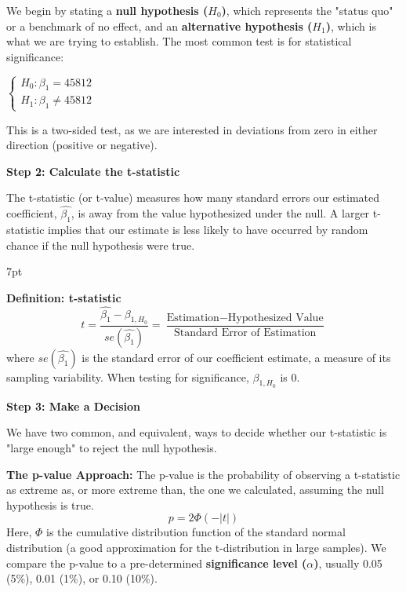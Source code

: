 \documentclass{article}
\newenvironment{greenblock}{%
\def\FrameCommand{%
  \hspace{1pt}%
    {\color{Green}%
    \vrule width 2pt}%
    {\color{greenshade}%
    \vrule width 4pt}%
  \colorbox{greenshade}%
}%
\MakeFramed{%
  \advance%
  \hsize-%
  \width%
  \FrameRestore}%
\noindent\hspace{-4.55pt}%
\begin{adjustwidth}{}{7pt}%
\vspace{2pt}\vspace{2pt}%
}
{%
\vspace{2pt}\end{adjustwidth}\endMakeFramed%
}
\begin{document}
We begin by stating a \textbf{null hypothesis ($H_0$)}, which represents the "status quo" or a benchmark of no effect, and an \textbf{alternative hypothesis ($H_1$)}, which is what we are trying to establish. The most common test is for statistical significance:

$\begin{cases}
  H_0: \beta_1  = 45812
  \\
  H_1: \beta_1 \neq 45812
\end{cases}$

This is a two-sided test, as we are interested in deviations from zero in either direction (positive or negative).

\textbf{Step 2: Calculate the t-statistic}

The t-statistic (or t-value) measures how many standard errors our estimated coefficient, $\hat{\beta_1}$, is away from the value hypothesized under the null. A larger t-statistic implies that our estimate is less likely to have occurred by random chance if the null hypothesis were true.

\begin{greenblock}
\textbf{Definition: t-statistic}
\begin{equation}
  t=\frac{\hat{\beta_{1}}-\beta_{1, H_0}}{se(\hat{\beta_{1}})}=\frac{\text{Estimation}-\text{Hypothesized Value}}{\text{Standard Error of Estimation}}
\end{equation}
where $se(\hat{\beta_1})$ is the standard error of our coefficient estimate, a measure of its sampling variability. When testing for significance, $\beta_{1, H_0}$ is 0.
\end{greenblock}

\textbf{Step 3:  Make a Decision}

We have two common, and equivalent, ways to decide whether our t-statistic is "large enough" to reject the null hypothesis.


\textbf{The p-value Approach:} The p-value is the probability of observing a t-statistic as extreme as, or more extreme than, the one we calculated, assuming the null hypothesis is true.
\begin{equation}
  p=2 \Phi(-|t|)
\end{equation}
Here, $\Phi$ is the cumulative distribution function of the standard normal distribution (a good approximation for the t-distribution in large samples). We compare the p-value to a pre-determined \textbf{significance level ($\alpha$)}, usually 0.05 (5\%), 0.01 (1\%), or 0.10 (10\%).
\end{document}
